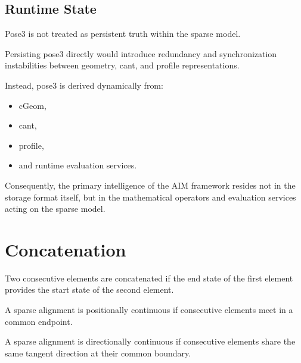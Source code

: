 \subsection{Runtime State}

\begin{proposition}
Pose3 is not treated as persistent truth within the sparse model.
\end{proposition}

Persisting pose3 directly would introduce redundancy and synchronization
instabilities between geometry, cant, and profile representations.

Instead, pose3 is derived dynamically from:
\begin{itemize}
\item cGeom,
\item cant,
\item profile,
\item and runtime evaluation services.
\end{itemize}

Consequently, the primary intelligence of the AIM framework resides not
in the storage format itself, but in the mathematical operators and
evaluation services acting on the sparse model.

\section{Concatenation}

\begin{definition}
Two consecutive elements are concatenated if the end state of the first
element provides the start state of the second element.
\end{definition}

\begin{definition}
A sparse alignment is positionally continuous if consecutive elements
meet in a common endpoint.
\end{definition}

\begin{definition}
A sparse alignment is directionally continuous if consecutive elements
share the same tangent direction at their common boundary.
\end{definition}

